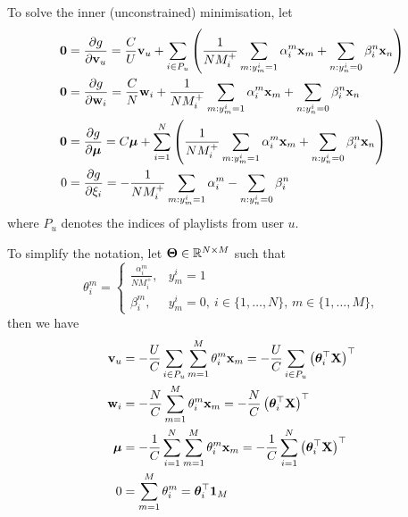To solve the inner (unconstrained) minimisation, let
\begin{equation*}
\begin{aligned}
\mathbf{0} &= \frac{\partial g}{\partial \mathbf{v}_u} 
       = \frac{C}{U} \mathbf{v}_u 
         + \sum_{i \in P_u} \left( \frac{1}{N M_i^+} \sum_{m: y_m^i = 1} \alpha_i^m \mathbf{x}_m + \sum_{n: y_n^i = 0} \beta_i^n \mathbf{x}_n \right) \\
\mathbf{0} &= \frac{\partial g}{\partial \mathbf{w}_i}
       = \frac{C}{N} \mathbf{w}_i + \frac{1}{N M_i^+} \sum_{m: y_m^i = 1} \alpha_i^m \mathbf{x}_m + \sum_{n: y_n^i = 0} \beta_i^n \mathbf{x}_n \\
\mathbf{0} &= \frac{\partial g}{\partial \bm{\mu}} 
       = C \bm{\mu} + \sum_{i=1}^N \left( \frac{1}{N M_i^+} \sum_{m: y_m^i = 1} \alpha_i^m \mathbf{x}_m + \sum_{n: y_n^i = 0} \beta_i^n \mathbf{x}_n \right) \\
0     &= \frac{\partial g}{\partial \xi_i}
       = - \frac{1}{N M_i^+} \sum_{m: y_m^i = 1} \alpha_i^m - \sum_{n: y_n^i = 0} \beta_i^n \\
\end{aligned}
\end{equation*}
where $P_u$ denotes the indices of playlists from user $u$.

To simplify the notation, let $\mathbf{\Theta} \in \mathbb{R}^{N \times M}$ such that
\begin{equation*}
\theta_i^m = 
\begin{cases}
    \frac{\alpha_i^m}{N M_i^+}, & y_m^i = 1 \\
    \beta_i^m, & y_m^i = 0, \ i \in \{1,\dots,N\}, \, m \in \{1,\dots,M\},
\end{cases}
\end{equation*}
then we have
\begin{equation}
\label{eq:dual2primal}
\begin{aligned}
\bv_u
&= -\frac{U}{C} \sum_{i \in P_u} \sum_{m=1}^M \theta_i^m \x_m
 = -\frac{U}{C} \sum_{i \in P_u} \left( \thetabm_i^\top \X \right)^\top \\
%
\w_i
&= -\frac{N}{C} \sum_{m=1}^M \theta_i^m \x_m
 = -\frac{N}{C} \left( \thetabm_i^\top \X \right)^\top \\
%
\mubm
&= -\frac{1}{C} \sum_{i=1}^N \sum_{m=1}^M \theta_i^m \x_m 
 = -\frac{1}{C} \sum_{i=1}^N \left( \thetabm_i^\top \X \right)^\top \\
%
0
&= \sum_{m=1}^M \theta_i^m 
 = \thetabm_i^\top \one_M
\end{aligned}
\end{equation}

